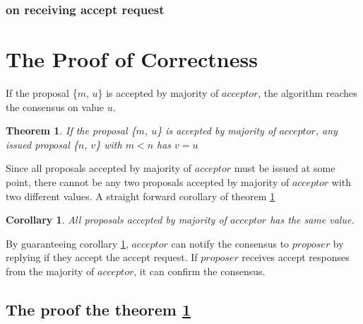 \documentclass{article}
\newtheorem{theorem}{Theorem}
\newtheorem{corollary}{Corollary}
\begin{document}
    \subsubsection{on receiving accept request}
    \label{algorithm:acceptor:accept}
    


\section{The Proof of Correctness}

    If the proposal \{$m$, $u$\} is accepted by majority of $acceptor$, the algorithm reaches the consensus on value $u$.
    
    \begin{theorem}
    \label{theorem:1}
    If the proposal \{$m$, $u$\} is accepted by majority of $acceptor$, any issued proposal \{$n$, $v$\} with $m < n$ has $v = u$
    \end{theorem}
    
    Since all proposals accepted by majority of $acceptor$ must be issued at some point, there cannot be any two proposals accepted by majority of $acceptor$ with two different values. A straight forward corollary of theorem \ref{theorem:1}
    
    \begin{corollary}
    \label{corollary:1}
    All proposals accepted by majority of $acceptor$ has the same value.
    \end{corollary}
    
    By guaranteeing corollary \ref{corollary:1}, $acceptor$ can notify the consensus to $proposer$ by replying if they accept the accept request. If $proposer$ receives accept responses from the majority of $acceptor$, it can confirm the consensus.
    
    \subsection{The proof the theorem \ref{theorem:1}}
    
\end{document}
